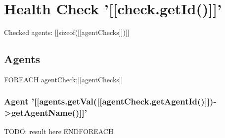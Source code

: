 \documentclass[12pt]{article}
\begin{document}
\section*{Health Check '[[check.getId()]]'}

Checked agents: [[sizeof([[agentChecks]])]]\\

\subsection*{Agents}

{{FOREACH agentCheck;[[agentChecks]]}}
	\subsubsection*{Agent '[[agents.getVal([[agentCheck.getAgentId()]])->getAgentName()]]'}
	TODO: result here
{{ENDFOREACH}}
\end{document}
